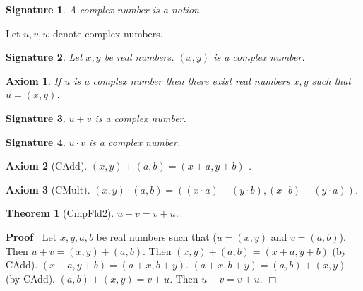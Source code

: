 \documentclass{article}
\newenvironment{forthel}{\begin{leftbar}}{\end{leftbar}}
\newenvironment{proof}{\noindent\textbf{Proof\ }}{\hspace*{\fill}$\Box$\medskip}
\newtheorem{axiom}{Axiom}
\newtheorem{theorem}{Theorem}
\newtheorem{signature}{Signature}
\newcommand{\cmul}{\cdot}
\newcommand{\cadd}{+}
\begin{document}
\begin{forthel}


\begin{signature} A complex number is a notion.
\end{signature}

Let $u,v,w$ denote complex numbers.
\begin{signature} Let $x,y$ be real numbers. $(x,y)$ is a complex number.
\end{signature}

\begin{axiom} If $u$ is a complex number then there exist real numbers $x,y$ such that $u = (x,y)$.
\end{axiom}

\begin{signature} $u  \cadd  v$ is a complex number.
\end{signature}

\begin{signature} $u  \cmul  v$ is a complex number.
\end{signature}

\begin{axiom}[CAdd] $(x, y)  \cadd  (a, b) = (x + a, y + b)$ .
\end{axiom}

\begin{axiom}[CMult] $(x, y)  \cmul  (a, b) = ((x \cdot a) - (y \cdot b), (x \cdot b) + (y \cdot a))$.
\end{axiom}




\begin{theorem}[CmpFld2]  $u  \cadd  v = v  \cadd  u$.
\end{theorem}
\begin{proof} 
Let $x,y,a,b$ be real numbers such that ($u = (x,y)$ and $v = (a,b)$).\newline
Then $u  \cadd  v = (x,y)  \cadd  (a,b)$. \newline
Then $(x,y)  \cadd  (a,b) = (x + a, y + b)$ (by CAdd). \newline	
$(x + a, y + b) = (a + x, b + y)$. \newline
$(a + x, b + y) = (a,b)  \cadd  (x,y)$ (by CAdd).\newline
$(a,b)  \cadd  (x,y) = v  \cadd  u$. \newline
Then $u  \cadd  v = v  \cadd  u$.
\end{proof}
 




\end{forthel}
\end{document}
